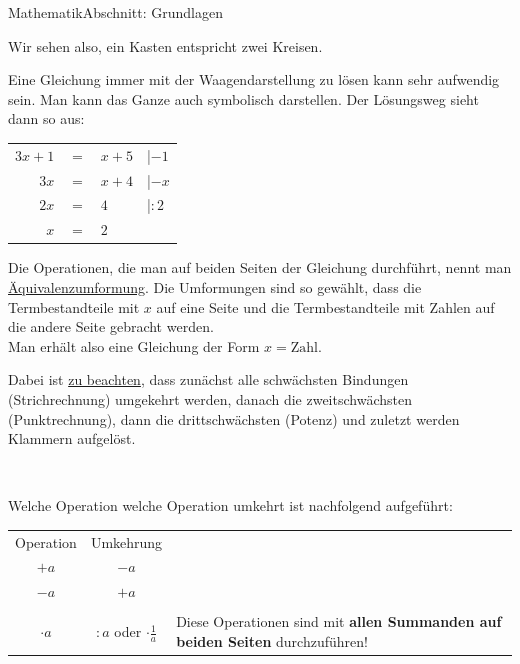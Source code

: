 \documentclass[11pt,twocolumn,oneside,openany,headings=optiontotoc,11pt,numbers=noenddot]{article}
\begin{document}
\begin{worksheet}{}{Mathematik}{Abschnitt: Grundlagen}
\begin{framed}
			\raggedright
			Wir sehen also, ein Kasten entspricht zwei Kreisen.\\
		\end{framed}
		\par\bigskip\noindent
		Eine Gleichung immer mit der Waagendarstellung zu lösen kann sehr aufwendig sein. Man kann das Ganze auch symbolisch darstellen. Der Lösungsweg sieht dann so aus:
		\begin{tabularx}{0.5\textwidth}{rcll}
			\(3x + 1\) & \(=\) & \(x+5\) & |\(-1\)\\
			\(3x\) & \(=\) & \(x+4\) & |\(-x\)\\
			\(2x\) & \(=\) & \(4\) & |\(:2\)\\
			\(x\) & \(=\) & \(2\)
		\end{tabularx}
		Die Operationen, die man auf beiden Seiten der Gleichung durchführt, nennt man \underline{Äquivalenzumformung}. Die Umformungen sind so gewählt, dass die Termbestandteile mit \(x\) auf eine Seite und die Termbestandteile mit Zahlen auf die andere Seite gebracht werden.\\
		Man erhält also eine Gleichung der Form \(x = \text{Zahl}\).\\
		\par\bigskip\noindent
		Dabei ist \underline{zu beachten}, dass zunächst alle schwächsten Bindungen (\color{blue}Stri\normalcolor{}chrechnung) umgekehrt werden, danach die zweitschwächsten (\color{blue}Pu\normalcolor{}nktrechnung), dann die drittschwächsten (\color{blue}Po\normalcolor{}tenz) und zuletzt werden \color{blue}Kla\normalcolor{}mmern aufgelöst.\\
		\par\bigskip\noindent
		\centering
		\\
		\raggedright
		\par\bigskip\noindent
		Welche Operation welche Operation umkehrt ist nachfolgend aufgeführt:
		\begin{tabularx}{0.45\textwidth}{|c|c|X|}
			\cline{1-2}
			Operation & Umkehrung & \multicolumn{1}{l}{}\\
			\cline{1-2}
			\(+a\) & \(-a\) & \multicolumn{1}{l}{} \\
			\cline{1-2}
			\(-a\) & \(+a\) & \multicolumn{1}{l}{} \\
			\hline
			\multicolumn{1}{|l|}{} & & \\
			\(\cdot{}a\) & \(:a\) oder \(\cdot{}\frac{1}{a}\) &
			\multirow{7}{0.1\textheight}{Diese Operationen sind mit \textbf{allen Summanden auf beiden Seiten} durchzuführen!}\\

\end{tabularx}
\end{worksheet}
\end{document}
